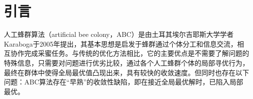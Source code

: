 \documentclass[a4paper,12pt]{report}
\begin{document}
\tableofcontents %


\chapter{引言}

\begin{spacing}{1.5}
	人工蜂群算法（artificial bee colony，ABC）是由土耳其埃尔吉耶斯大学学者Karaboga于2005年提出，其基本思想是启发于蜂群通过个体分工和信息交流，相互协作完成采蜜任务。与传统的优化方法相比，它的主要优点是不需要了解问题的特殊信息，只需要对问题进行优劣比较，通过各个人工蜂群个体的局部寻优行为，最终在群体中使得全局最优值凸现出来，具有较快的收敛速度。但同时也存在以下问题：ABC算法存在“早熟”的收敛性缺陷，即在接近全局最优解时，已陷入局部最优。

\end{spacing}
\end{document}
